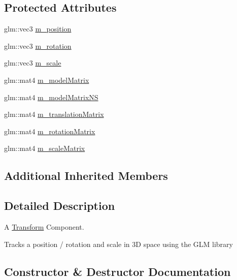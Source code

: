 \subsection*{Protected Attributes}
\begin{DoxyCompactItemize}
\item 
glm\+::vec3 \hyperlink{class_cookie_eng_1_1_components_1_1_transform_a6e99757f68b1de46b9caeaacdf6e88ae}{m\+\_\+position}
\item 
glm\+::vec3 \hyperlink{class_cookie_eng_1_1_components_1_1_transform_ab47df9535ea8c9b95ebd86b16381b86b}{m\+\_\+rotation}
\item 
glm\+::vec3 \hyperlink{class_cookie_eng_1_1_components_1_1_transform_a0bac06b21d49e96337fc82910fb4a5e9}{m\+\_\+scale}
\item 
glm\+::mat4 \hyperlink{class_cookie_eng_1_1_components_1_1_transform_ab4c66323537c12117739471665c6ddf9}{m\+\_\+model\+Matrix}
\item 
glm\+::mat4 \hyperlink{class_cookie_eng_1_1_components_1_1_transform_a247892c3be676ab7ec613600435cead8}{m\+\_\+model\+Matrix\+NS}
\item 
glm\+::mat4 \hyperlink{class_cookie_eng_1_1_components_1_1_transform_a8ab2d1886012bb7942ef4e4aafbd0321}{m\+\_\+translation\+Matrix}
\item 
glm\+::mat4 \hyperlink{class_cookie_eng_1_1_components_1_1_transform_aea4ccabe5423b8d31df96c6b9bd5553e}{m\+\_\+rotation\+Matrix}
\item 
glm\+::mat4 \hyperlink{class_cookie_eng_1_1_components_1_1_transform_aa41354d093d9821fb9a790517d97732f}{m\+\_\+scale\+Matrix}
\end{DoxyCompactItemize}
\subsection*{Additional Inherited Members}


\subsection{Detailed Description}
A \hyperlink{class_cookie_eng_1_1_components_1_1_transform}{Transform} Component. 

Tracks a position / rotation and scale in 3D space using the G\+LM library 

\subsection{Constructor \& Destructor Documentation}
\mbox{\label{class_cookie_eng_1_1_components_1_1_transform_a477bc2eb1d09fecdcb7399d5124ccd0d}} 
